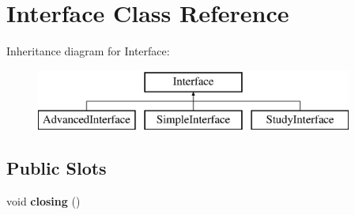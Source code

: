 \hypertarget{classInterface}{
\section{Interface Class Reference}
\label{classInterface}
}
Inheritance diagram for Interface:\begin{figure}[H]
\begin{center}
\leavevmode
\includegraphics[height=2cm]{classInterface}
\end{center}
\end{figure}
\subsection*{Public Slots}
\begin{DoxyCompactItemize}
\item 
\hypertarget{classInterface_a8324c4062e283e2b0bc21c3db79ff36b}{
void {\bfseries closing} ()}
\label{classInterface_a8324c4062e283e2b0bc21c3db79ff36b}

\end{DoxyCompactItemize}
